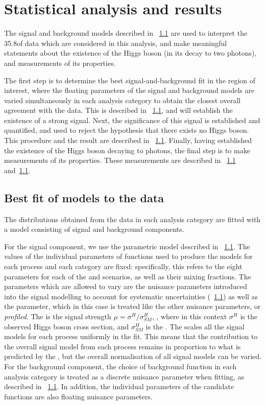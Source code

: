 \chapter{Statistical analysis and results}
\label{chap:statandresults}

The signal and background models described in \Chapter~\ref{} are used to interpret the 35.8\fb of data which are considered in this analysis, and make meaningful statements about the existence of the Higgs boson (in its decay to two photons), and measurements of its properties.

The first step is to determine the best signal-and-background fit in the region of interest, where the floating parameters of the signal and background models are varied simultaneously in each analysis category to obtain the closest overall agreement with the data. This is described in \Sec~\ref{}, and will establish the existence of a strong signal. Next, the significance of this signal is established and quantified, and used to reject the hypothesis that there exists no Higgs boson. This procedure and the result are described in \Sec~\ref{}. Finally, having established the existence of the Higgs boson decaying to photons, the final step is to make measurements of its properties. These measurements are described in \Sec\s~\ref{} and~\ref{}.



\section{Best fit of models to the data}

The \mgg distributions obtained from the data in each analysis category are fitted with a model consisting of signal and background components. 

For the signal component, we use the parametric model described in \Sec~\ref{}. The values of the individual parameters of \DCBpG functions used to produce the models for each process and each category are fixed: specifically, this refers to the eight \DCBpG parameters for each of the \RV and \WV scenarios, as well as their mixing fractions. The parameters which are allowed to vary are the nuisance parameters introduced into the signal modelling to account for systematic uncertainties (\Sec~\ref{}) as well as the \mH parameter, which in this case is treated like the other nuisance parameters, or \emph{profiled}. The \POI is the signal strength $\mu = \sigma^{H} / \sigma^{H}_{SM}$, , where in this context $\sigma^H$ is the observed Higgs boson cross section, and  $\sigma^H_{SM}$ is the \SM \crosssection. The scales all the signal models for each process uniformly in the fit. This means that the contribution to the overall signal model from each process remains in proportion to what is predicted by the \SM, but the overall normalisation of all signal models can be varied. 
For the background component, the choice of background function in each analysis category is treated as a discrete nuisance parameter when fitting, as described in \Sec~\ref{}. In addition, the individual parameters of the candidate functions are also floating nuisance parameters. 

